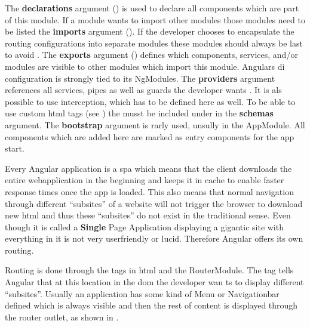 The \textbf{declarations} argument () is used to declare all components which are part of this module. If a module wants to import other modules those modules need to be listed  the \textbf{imports} argument (). If the developer chooses to encapsulate the routing configurations into separate modules these modules should always be last to avoid . The \textbf{exports} argument () defines which components, services, and/or modules are visible to other modules which import this module. Angulars \gls{di} configuration is strongly tied to its NgModules. The \textbf{providers} argument references all services, pipes as well as guards the developer wants . It is als possible to use interception, which has to be defined here as well. To be able to use custom \gls{html} tags (see ) the  musst be included under in the \textbf{schemas} argument. The \textbf{bootstrap} argument is rarly used, unsully in the AppModule. All components which are added here are marked as entry components for the app start.


Every Angular application is a \gls{spa} which means that the client downloads the entire webapplication in the beginning and keeps it in cache to enable faster response times once the app is loaded. This also means that normal navigation through different \enquote{subsites} of a website will not trigger the browser to download new \gls{html} and thus these \enquote{subsites} do not exist in the traditional sense. Even though it is called a \textbf{Single} Page Application displaying a gigantic site with everything in it is not very userfriendly or lucid. Therefore Angular offers its own routing.


Routing is done through the  tags in \gls{html} and the RouterModule. The  tag tells Angular that at this location in the \gls{dom} the developer wan
ts to display different \enquote{subsites}. Usually an application has some kind of Menu or Navigationbar defined which is always visible and then the rest of content is displayed through the router outlet, as shown in .

